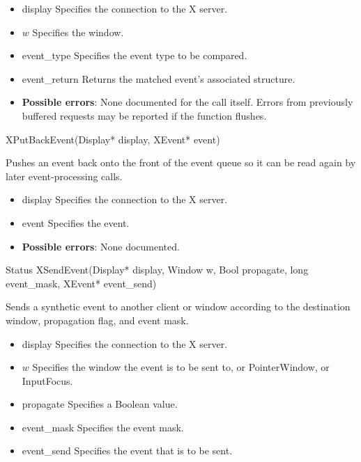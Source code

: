 \documentclass{report}
\begin{document}
\begin{itemize}
        \begin{itemize}
            \item display Specifies the connection to the X server.
            \item $w$ Specifies the window.
            \item event\_type Specifies the event type to be compared.
            \item event\_return Returns the matched event’s associated structure.
        \end{itemize}

        \begin{itemize}
            \item \textbf{Possible errors}: None documented for the call itself. Errors from previously buffered requests may be reported if the function flushes.
        \end{itemize}

        \begin{cppcode}
            XPutBackEvent(Display* display, XEvent* event)
        \end{cppcode}
        \bigbreak \noindent
        Pushes an event back onto the front of the event queue so it can be read again by later event-processing calls.

        \begin{itemize}
            \item display Specifies the connection to the X server.
            \item event Specifies the event.
        \end{itemize}

        \begin{itemize}
            \item \textbf{Possible errors}: None documented.
        \end{itemize}

        \begin{cppcode}
            Status XSendEvent(Display* display, Window w, Bool propagate, long event_mask, XEvent* event_send)
        \end{cppcode}
        \bigbreak \noindent
        Sends a synthetic event to another client or window according to the destination window, propagation flag, and event mask.

        \begin{itemize}
            \item display Specifies the connection to the X server.
            \item $w$ Specifies the window the event is to be sent to, or PointerWindow, or InputFocus.
            \item propagate Specifies a Boolean value.
            \item event\_mask Specifies the event mask.
            \item event\_send Specifies the event that is to be sent.
        \end{itemize}


\end{itemize}
\end{document}
